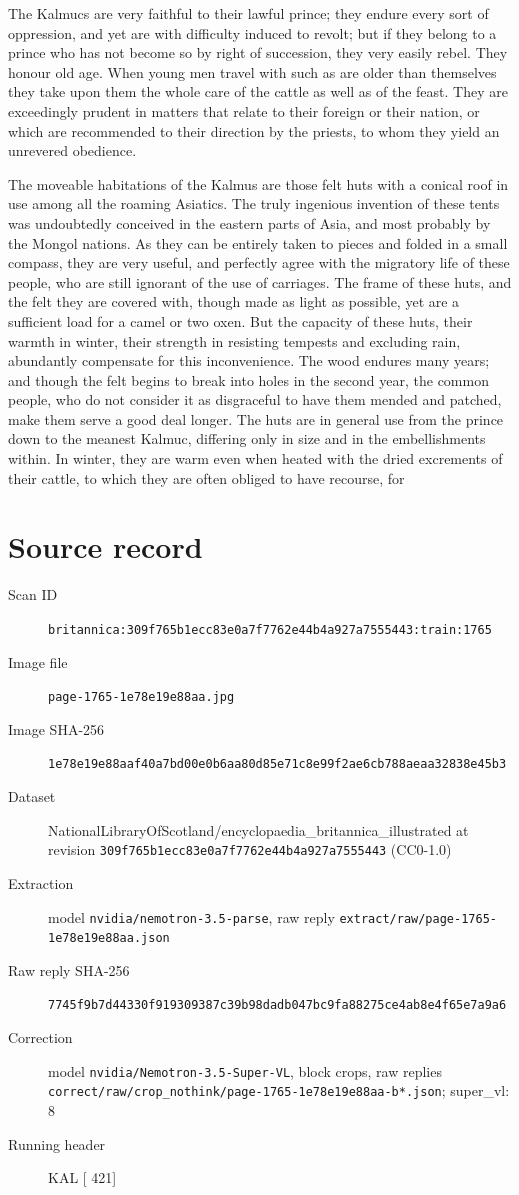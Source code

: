 \documentclass{article}
\begin{document}
The Kalmucs are very faithful to their lawful prince; they endure every sort of oppression, and yet are with difficulty induced to revolt; but if they belong to a prince who has not become so by right of succession, they very easily rebel. They honour old age. When young men travel with such as are older than themselves they take upon them the whole care of the cattle as well as of the feast. They are exceedingly prudent in matters that relate to their foreign or their nation, or which are recommended to their direction by the priests, to whom they yield an unrevered obedience.

The moveable habitations of the Kalmus are those felt huts with a conical roof in use among all the roaming Asiatics. The truly ingenious invention of these tents was undoubtedly conceived in the eastern parts of Asia, and most probably by the Mongol nations. As they can be entirely taken to pieces and folded in a small compass, they are very useful, and perfectly agree with the migratory life of these people, who are still ignorant of the use of carriages. The frame of these huts, and the felt they are covered with, though made as light as possible, yet are a sufficient load for a camel or two oxen. But the capacity of these huts, their warmth in winter, their strength in resisting tempests and excluding rain, abundantly compensate for this inconvenience. The wood endures many years; and though the felt begins to break into holes in the second year, the common people, who do not consider it as disgraceful to have them mended and patched, make them serve a good deal longer. The huts are in general use from the prince down to the meanest Kalmuc, differing only in size and in the embellishments within. In winter, they are warm even when heated with the dried excrements of their cattle, to which they are often obliged to have recourse, for


\section*{Source record}
\begin{description}
\item[Scan ID] \texttt{britannica:309f765b1ecc83e0a7f7762e44b4a927a7555443:train:1765}
\item[Image file] \texttt{page-1765-1e78e19e88aa.jpg}
\item[Image SHA-256] \texttt{1e78e19e88aaf40a7bd00e0b6aa80d85e71c8e99f2ae6cb788aeaa32838e45b3}
\item[Dataset] NationalLibraryOfScotland/encyclopaedia\_britannica\_illustrated at revision \texttt{309f765b1ecc83e0a7f7762e44b4a927a7555443} (CC0-1.0)
\item[Extraction] model \texttt{nvidia/nemotron-3.5-parse}, raw reply \texttt{extract/raw/page-1765-1e78e19e88aa.json}
\item[Raw reply SHA-256] \texttt{7745f9b7d44330f919309387c39b98dadb047bc9fa88275ce4ab8e4f65e7a9a6}
\item[Correction] model \texttt{nvidia/Nemotron-3.5-Super-VL}, block crops, raw replies \texttt{correct/raw/crop\_nothink/page-1765-1e78e19e88aa-b*.json}; super\_vl: 8
\item[Running header] KAL [ 421]
\end{description}
\end{document}
